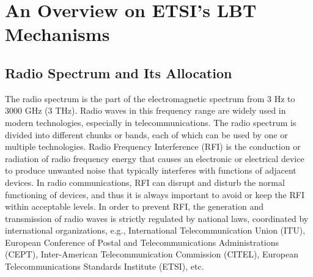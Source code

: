 %
%
%
\chapter{An Overview on ETSI’s LBT Mechanisms}
\label{sec:LBT-overview} 



\section{Radio Spectrum and Its Allocation}

The radio spectrum is the part of the electromagnetic spectrum from $3$ Hz to $3000$ GHz ($3$ THz). Radio waves in this frequency range are widely used in modern technologies, especially in telecommunications. The radio spectrum is divided into different chunks or bands, each of which can be used by one or multiple technologies. Radio Frequency Interference (RFI) is the conduction or radiation of radio frequency energy that causes an electronic or electrical device to produce unwanted noise that typically interferes with functions of adjacent devices.  In radio communications, RFI can disrupt and disturb the normal functioning of devices, and thus it is always important to avoid or keep the RFI within acceptable levels. In order to prevent RFI, the generation and transmission of radio waves is strictly regulated by national laws, coordinated by international organizations, e.g., International Telecommunication Union (ITU), European Conference of Postal and Telecommunications Administrations (CEPT), Inter-American Telecommunication Commission (CITEL), European Telecommunications Standards Institute (ETSI), etc. 

